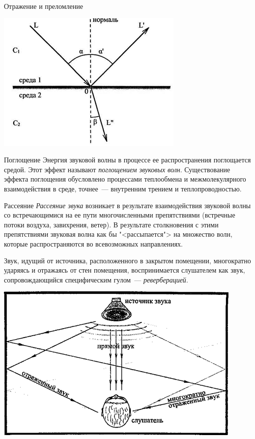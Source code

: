 \documentclass{beamer}
\begin{document}
\begin{frame}
\begin{block}{Отражение и преломление}
\begin{center}
\includegraphics[scale=0.8]{pic-reflection-01}
\end{center}
\end{block}
\end{frame}
\begin{frame}
\begin{block}{Поглощение}
Энергия звуковой волны в процессе ее распространения поглощается средой. Этот эффект называют {\itshape поглощением звуковых волн}. Существование эффекта поглощения обусловлено процессами теплообмена и межмолекулярного взаимодействия в среде, точнее~--- внутренним трением и теплопроводностью.
\end{block}
\begin{block}{Рассеяние}
{\itshape Рассеяние звука} возникает в результате взаимодействия звуковой волны со встречающимися на ее пути многочисленными препятствиями (встречные потоки воздуха, завихрения, ветер). 
В результате столкновения с этими препятствиями звуковая волна как бы "<рассыпается"> на множество волн, которые распространяются во всевозможных направлениях.
\end{block}
\end{frame}

\begin{frame}
Звук, идущий от источника, расположенного в закрытом помещении, многократно ударяясь и отражаясь от стен помещения, воспринимается слушателем как звук, сопровождающийся специфическим гулом~--- {\itshape реверберацией}.
\begin{center}
\includegraphics[scale=0.8]{pic-reverberation-01}
\end{center}
\end{frame}
\end{document}

